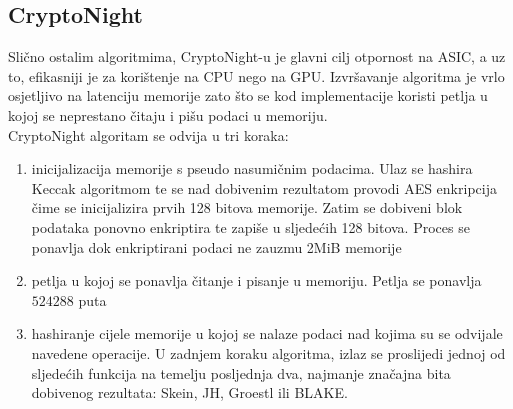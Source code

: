\documentclass[12pt]{article}
\begin{document}
\subsection{CryptoNight}
Slično ostalim algoritmima, CryptoNight-u je glavni cilj otpornost na ASIC, a uz to, efikasniji je za korištenje na CPU nego na GPU. Izvršavanje algoritma je vrlo osjetljivo na latenciju memorije zato što se kod implementacije koristi petlja u kojoj se neprestano čitaju i pišu podaci u memoriju.\\
CryptoNight algoritam se odvija u tri koraka:
\begin{enumerate}
	\item inicijalizacija memorije s pseudo nasumičnim podacima. Ulaz se hashira Keccak algoritmom te se nad dobivenim rezultatom provodi AES enkripcija čime se inicijalizira prvih 128 bitova memorije. Zatim se dobiveni blok podataka ponovno enkriptira te zapiše u sljedećih 128 bitova. Proces se ponavlja dok enkriptirani podaci ne zauzmu 2MiB memorije
	\item petlja u kojoj se ponavlja čitanje i pisanje u memoriju. Petlja se ponavlja $524 288$ puta
	\item hashiranje cijele memorije u kojoj se nalaze podaci nad kojima su se odvijale navedene operacije. U zadnjem koraku algoritma, izlaz se proslijedi jednoj od sljedećih funkcija na temelju posljednja dva, najmanje značajna bita dobivenog rezultata: Skein, JH, Groestl ili BLAKE.\cite{cryptonighgt}
\end{enumerate}

\pagebreak
\end{document}
